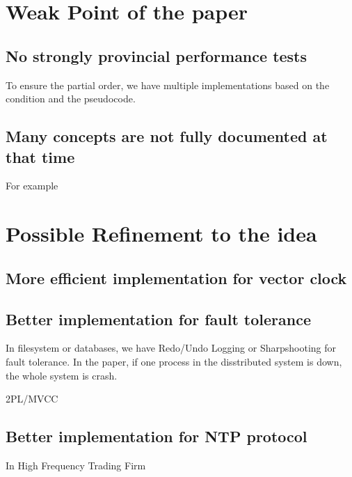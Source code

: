 \documentclass[acmlarge]{acmart}
\begin{document}
\section{Weak Point of the paper}
\subsection {No strongly provincial performance tests} 
To ensure the partial order, we have multiple implementations based on the condition and the pseudocode.

\subsection{Many concepts are not fully documented at that time} 
For example

\section{Possible Refinement to the idea}
\subsection {More efficient implementation for vector clock}


\subsection {Better implementation for fault tolerance}
In filesystem or databases, we have Redo/Undo Logging or Sharpshooting for fault tolerance. In the paper, if one process in the disstributed system is down, the whole system is crash.

2PL/MVCC

\subsection{Better implementation for NTP protocol} 
In High Frequency Trading Firm
\cite{HFT-PTP-NTP} %





\end{document}
